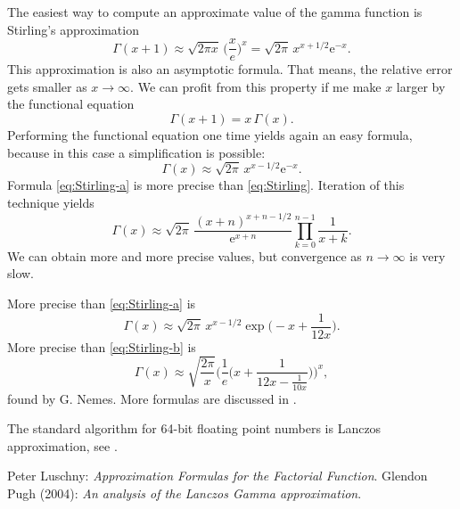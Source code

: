 \documentclass[a4paper,10pt,fleqn]{scrartcl}
\numberwithin{equation}{section}
\newcommand{\ee}{\mathrm e}
\begin{document}
The easiest way to compute an approximate value of the gamma function
is Stirling's approximation
\begin{equation}\label{eq:Stirling}
\Gamma(x+1) \approx \sqrt{2\pi x}\,\bigg(\frac{x}{e}\bigg)^x
= \sqrt{2\pi}\,x^{x+1/2}\ee^{-x}.
\end{equation}
This approximation is also an asymptotic formula. That means, the
relative error gets smaller as $x\to\infty$. We can profit from
this property if me make $x$ larger by the functional equation
\begin{equation}
\Gamma(x+1) = x\,\Gamma(x).
\end{equation}
Performing the functional equation one time yields again an easy
formula, because in this case a simplification is possible:
\begin{equation}\label{eq:Stirling-a}
\Gamma(x) \approx \sqrt{2\pi}\,x^{x-1/2}\ee^{-x}.
\end{equation}
Formula \eqref{eq:Stirling-a} is more
precise than \eqref{eq:Stirling}. Iteration of this technique yields
\begin{equation}
\Gamma(x) \approx \sqrt{2\pi}\,\frac{(x+n)^{x+n-1/2}}{\ee^{x+n}}
\prod_{k=0}^{n-1} \frac{1}{x+k}.
\end{equation}
We can obtain more and more precise values, but convergence
as $n\to\infty$ is very slow.

More precise than \eqref{eq:Stirling-a} is
\begin{equation}\label{eq:Stirling-b}
\Gamma(x) \approx \sqrt{2\pi}\,x^{x-1/2}\exp\bigg(-x+\frac{1}{12x}\bigg).
\end{equation}
More precise than \eqref{eq:Stirling-b} is
\begin{equation}\label{eq:Nemes}
\Gamma(x) \approx \sqrt{\frac{2\pi}{x} }
\bigg(\frac{1}{e} \bigg(x + \frac{1}{12x - \frac{1}{10x}}\bigg)\bigg)^x,
\end{equation}
found by G. Nemes. More formulas are discussed in \cite{Luschny}.

The standard algorithm for 64-bit floating point numbers is
Lanczos approximation, see \cite{Pugh}.

\begin{thebibliography}{x}
Peter Luschny: \emph{Approximation Formulas for the Factorial Function}.
Glendon Pugh (2004): \emph{An analysis of the Lanczos Gamma approximation}.
\end{thebibliography}
\end{document}
